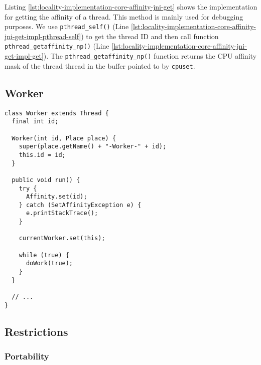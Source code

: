 Listing \ref{lst:locality-implementation-core-affinity-jni-get} shows
the implementation for getting the affinity of a thread. This method
is mainly used for debugging purposes. We use
\lstinline!pthread_self()! (Line
\ref{lst:locality-implementation-core-affinity-jni-get-impl-pthread-self})
to get the thread ID and then call function
\lstinline!pthread_getaffinity_np()!  (Line
\ref{lst:locality-implementation-core-affinity-jni-get-impl-get}). The
\lstinline!pthread_getaffinity_np()! function returns the CPU affinity
mask of the thread thread in the buffer pointed to by
\lstinline!cpuset!.



\subsection{Worker}
\label{sec:locality-implementation-core-affinity-worker}


\begin{lstlisting}[style=FloatNumbers,
  caption={TODO},
  label=lst:locality-implementation-worker]
class Worker extends Thread {
  final int id;
  
  Worker(int id, Place place) {
    super(place.getName() + "-Worker-" + id);
    this.id = id;
  }

  public void run() {
    try {
      Affinity.set(id);
    } catch (SetAffinityException e) {
      e.printStackTrace();
    }
    
    currentWorker.set(this);
    
    while (true) {
      doWork(true);
    }
  }

  // ...
}
\end{lstlisting}

\subsection{Restrictions}
\label{sec:locality-implementation-core-affinity-restrictions}

\subsubsection{Portability}

